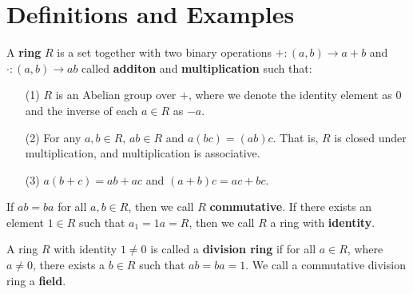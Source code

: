 \section{Definitions and Examples}
\label{section1}

\begin{definition}
  A \textbf{ring} $R$ is a set together with two binary operations  $+:(a,b)
  \xrightarrow{} a+b$ and $\cdot:(a,b) \xrightarrow{} ab$ called
  \textbf{additon} and \textbf{multiplication} such that:
  \begin{enumerate}
    \item[(1)] $R$ is an Abelian group over $+$, where we denote the
      identity element as $0$ and the inverse of each $a \in R$ as $-a$.

    \item[(2)] For any $a,b \in R$,  $ab \in R$ and $a(bc)=(ab)c$. That is,
      $R$ is closed under multiplication, and  multiplication is
      associative.

    \item[(3)] $a(b+c)=ab+ac$ and $(a+b)c=ac+bc$.
  \end{enumerate}
  If $ab=ba$ for all  $a,b \in R$, then we call $R$ \textbf{commutative}. If
  there exists an element $1 \in R$ such that  $a_1=1a=R$, then we call $R$ a
  ring with  \textbf{identity}.
\end{definition}

\begin{definition}
  A ring $R$ with identity $1 \neq 0$ is called a \textbf{division ring} if
  for all $a \in R$, where  $a \neq 0$, there exists a  $b \in R$ such that
  $ab=ba=1$. We call a commutative division ring a \textbf{field}.
\end{definition}

